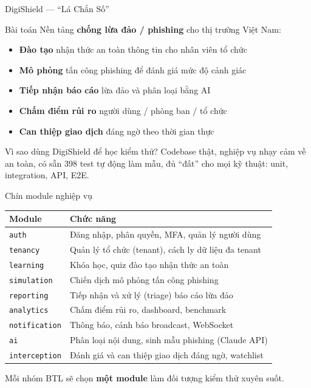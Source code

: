 \documentclass[aspectratio=169,12pt]{beamer}
\begin{document}
\begin{frame}{DigiShield --- ``Lá Chắn Số''}
  \begin{block}{Bài toán}
    Nền tảng \textbf{chống lừa đảo / phishing} cho thị trường Việt Nam:
    \begin{itemize}
      \item \textbf{Đào tạo} nhận thức an toàn thông tin cho nhân viên tổ chức
      \item \textbf{Mô phỏng} tấn công phishing để đánh giá mức độ cảnh giác
      \item \textbf{Tiếp nhận báo cáo} lừa đảo và phân loại bằng AI
      \item \textbf{Chấm điểm rủi ro} người dùng / phòng ban / tổ chức
      \item \textbf{Can thiệp giao dịch} đáng ngờ theo thời gian thực
    \end{itemize}
  \end{block}

  \vspace{0.3em}
  \begin{exampleblock}{Vì sao dùng DigiShield để học kiểm thử?}
    \small Codebase thật, nghiệp vụ nhạy cảm về an toàn, có sẵn 398 test
    tự động làm mẫu, đủ ``đất'' cho mọi kỹ thuật: unit, integration, API, E2E.
  \end{exampleblock}
\end{frame}

\begin{frame}[shrink=8]{Chín module nghiệp vụ}
  \begin{center}
  \small
  \begin{tabular}{lp{9.2cm}}
    \toprule
    \textbf{Module} & \textbf{Chức năng} \\
    \midrule
    \texttt{auth}         & Đăng nhập, phân quyền, MFA, quản lý người dùng \\
    \texttt{tenancy}      & Quản lý tổ chức (tenant), cách ly dữ liệu đa tenant \\
    \texttt{learning}     & Khóa học, quiz đào tạo nhận thức an toàn \\
    \texttt{simulation}   & Chiến dịch mô phỏng tấn công phishing \\
    \texttt{reporting}    & Tiếp nhận và xử lý (triage) báo cáo lừa đảo \\
    \texttt{analytics}    & Chấm điểm rủi ro, dashboard, benchmark \\
    \texttt{notification} & Thông báo, cảnh báo broadcast, WebSocket \\
    \texttt{ai}           & Phân loại nội dung, sinh mẫu phishing (Claude API) \\
    \texttt{interception} & Đánh giá và can thiệp giao dịch đáng ngờ, watchlist \\
    \bottomrule
  \end{tabular}
  \end{center}

  \vspace{0.3em}
  {\small Mỗi nhóm BTL sẽ chọn \textbf{một module} làm đối tượng kiểm thử xuyên suốt.}
\end{frame}
\end{document}
